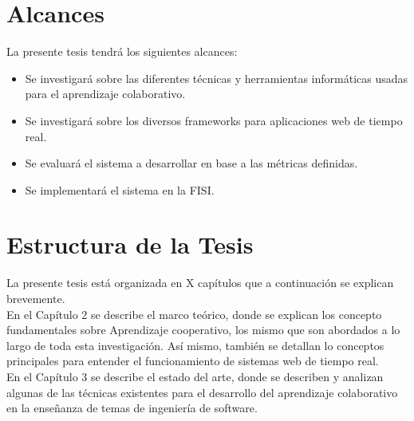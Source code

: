 \section{Alcances}
La presente tesis tendrá los siguientes alcances:
\begin{itemize}
  \item Se investigará sobre las diferentes técnicas y herramientas informáticas usadas para el aprendizaje colaborativo.
  \item Se investigará sobre los diversos frameworks para aplicaciones web de tiempo real.
  \item Se evaluará el sistema a desarrollar en base a las métricas definidas.
  \item Se implementará el sistema en la FISI.
\end{itemize}

\section{Estructura de la Tesis}
La presente tesis está organizada en X capítulos que a continuación se explican brevemente.\\

En el Capítulo 2 se describe el marco teórico, donde se explican los concepto fundamentales sobre Aprendizaje cooperativo, los mismo que son abordados a lo largo de toda esta investigación. Así mismo, también se detallan lo conceptos principales para entender el funcionamiento de sistemas web de tiempo real.\\

En el Capítulo 3 se describe el estado del arte, donde se describen y analizan algunas de las técnicas existentes para el desarrollo del aprendizaje colaborativo en la enseñanza de temas de ingeniería de software.


